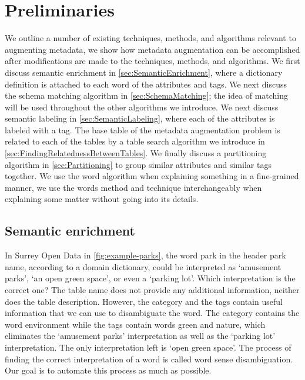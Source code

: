 
\chapter{Preliminaries}
\label{ch:Preliminaries}

We outline a number of existing techniques, methods, and algorithms relevant to augmenting metadata, we show how metadata augmentation can be accomplished after modifications are made to the techniques, methods, and algorithms. We first discuss semantic enrichment in \autoref{sec:SemanticEnrichment}, where a dictionary definition is attached to each word of the attributes and tags. We next discuss the schema matching algorithm in \autoref{sec:SchemaMatching}; the idea of matching will be used throughout the other algorithms we introduce. We next discuss semantic labeling in \autoref{sec:SemanticLabeling}, where each of the attributes is labeled with a tag. The base table of the metadata augmentation problem is related to each of the tables by a table search algorithm we introduce in \autoref{sec:FindingRelatednessBetweenTables}. We finally discuss a partitioning algorithm in \autoref{sec:Partitioning} to group similar attributes and similar tags together. We use the word algorithm when explaining something in a fine-grained manner, we use the words method and technique interchangeably when explaining some matter without going into its details.

\section{Semantic enrichment}
\label{sec:SemanticEnrichment}

In Surrey Open Data in \autoref{fig:example-parks}, the word park in the header park name, according to a domain dictionary, could be interpreted as `amusement parks', `an open green space', or even a `parking lot'. Which interpretation is the correct one? The table name does not provide any additional information, neither does the table description. However, the category and the tags contain useful information that we can use to disambiguate the word. The category contains the word environment while the tags contain words green and nature, which eliminates the `amusement parks' interpretation as well as the `parking lot' interpretation. The only interpretation left is `open green space'. The process of finding the correct interpretation of a word is called word sense disambiguation. Our goal is to automate this process as much as possible.

